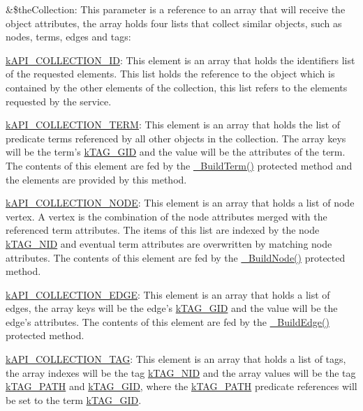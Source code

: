 \begin{DoxyItemize}
\item {\ttfamily \&\$the\-Collection}\-: This parameter is a reference to an array that will receive the object attributes, the array holds four lists that collect similar objects, such as nodes, terms, edges and tags\-: 
\begin{DoxyItemize}
\item {\ttfamily \hyperlink{}{k\-A\-P\-I\-\_\-\-C\-O\-L\-L\-E\-C\-T\-I\-O\-N\-\_\-\-I\-D}}\-: This element is an array that holds the identifiers list of the requested elements. This list holds the reference to the object which is contained by the other elements of the collection, this list refers to the elements requested by the service. 
\item {\ttfamily \hyperlink{}{k\-A\-P\-I\-\_\-\-C\-O\-L\-L\-E\-C\-T\-I\-O\-N\-\_\-\-T\-E\-R\-M}}\-: This element is an array that holds the list of predicate terms referenced by all other objects in the collection. The array keys will be the term's \hyperlink{}{k\-T\-A\-G\-\_\-\-G\-I\-D} and the value will be the attributes of the term. The contents of this element are fed by the \hyperlink{class_c_ontology_wrapper_a7d37edd771ffa60b36ead632c2e46534}{\-\_\-\-Build\-Term()} protected method and the elements are provided by this method. 
\item {\ttfamily \hyperlink{}{k\-A\-P\-I\-\_\-\-C\-O\-L\-L\-E\-C\-T\-I\-O\-N\-\_\-\-N\-O\-D\-E}}\-: This element is an array that holds a list of node vertex. A vertex is the combination of the node attributes merged with the referenced term attributes. The items of this list are indexed by the node \hyperlink{}{k\-T\-A\-G\-\_\-\-N\-I\-D} and eventual term attributes are overwritten by matching node attributes. The contents of this element are fed by the \hyperlink{class_c_ontology_wrapper_a3149d34bb488513db2d572f3002bebce}{\-\_\-\-Build\-Node()} protected method. 
\item {\ttfamily \hyperlink{}{k\-A\-P\-I\-\_\-\-C\-O\-L\-L\-E\-C\-T\-I\-O\-N\-\_\-\-E\-D\-G\-E}}\-: This element is an array that holds a list of edges, the array keys will be the edge's \hyperlink{}{k\-T\-A\-G\-\_\-\-G\-I\-D} and the value will be the edge's attributes. The contents of this element are fed by the \hyperlink{}{\-\_\-\-Build\-Edge()} protected method. 
\item {\ttfamily \hyperlink{}{k\-A\-P\-I\-\_\-\-C\-O\-L\-L\-E\-C\-T\-I\-O\-N\-\_\-\-T\-A\-G}}\-: This element is an array that holds a list of tags, the array indexes will be the tag \hyperlink{}{k\-T\-A\-G\-\_\-\-N\-I\-D} and the array values will be the tag \hyperlink{}{k\-T\-A\-G\-\_\-\-P\-A\-T\-H} and \hyperlink{}{k\-T\-A\-G\-\_\-\-G\-I\-D}, where the \hyperlink{}{k\-T\-A\-G\-\_\-\-P\-A\-T\-H} predicate references will be set to the term \hyperlink{}{k\-T\-A\-G\-\_\-\-G\-I\-D}. 

\end{DoxyItemize}
\end{DoxyItemize}
